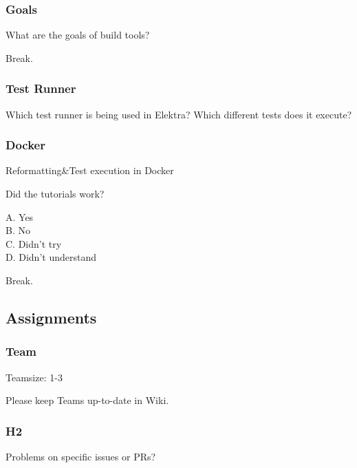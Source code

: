 \begin{frame}
	\frametitle{Goals}

	What are the goals of build tools?
\end{frame}

\begin{assignment}
	\begin{task}
	Break.
	\end{task}
\end{assignment}


\begin{frame}
	\frametitle{Test Runner}

	Which test runner is being used in Elektra?
	Which different tests does it execute?
\end{frame}

\begin{frame}
	\frametitle{Docker}

	Reformatting\&Test execution in Docker

	Did the tutorials work?

	A. Yes \\
	B. No \\
	C. Didn't try \\
	D. Didn't understand
\end{frame}

\begin{assignment}
	\begin{task}
	Break.
	\end{task}
\end{assignment}


\subsection{Assignments}

\begin{assignment}
	\frametitle{Team}
	Teamsize: 1-3

	\begin{task}
	Please keep Teams up-to-date in Wiki.
	\end{task}
\end{assignment}

\begin{assignment}
	\frametitle{H2}

	\begin{task}
	Problems on specific issues or PRs?
	\end{task}
\end{assignment}

